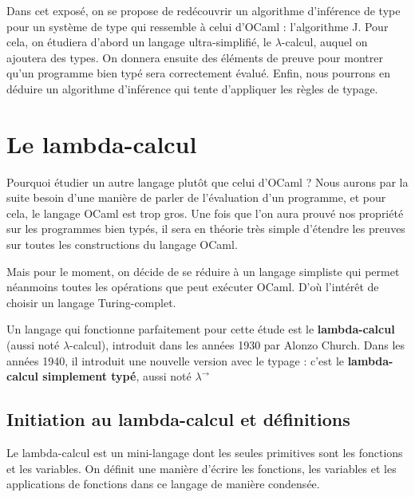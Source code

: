 \documentclass[11pt]{article}
\begin{document}
Dans cet exposé, on se propose de redécouvrir un algorithme d'inférence de type pour un système de type qui ressemble à celui d'OCaml : l'algorithme J. Pour cela, on étudiera d'abord un langage ultra-simplifié, le $\lambda$-calcul, auquel on ajoutera des types. On donnera ensuite des éléments de preuve pour montrer qu'un programme bien typé sera correctement évalué. Enfin, nous pourrons en déduire un algorithme d'inférence qui tente d'appliquer les règles de typage.


\section{Le lambda-calcul}

Pourquoi étudier un autre langage plutôt que celui d'OCaml ? Nous aurons par la suite besoin d'une manière de parler de l'évaluation d'un programme, et pour cela, le langage OCaml est trop gros. Une fois que l'on aura prouvé nos propriété sur les programmes bien typés, il sera en théorie très simple d'étendre les preuves sur toutes les constructions du langage OCaml.

Mais pour le moment, on décide de se réduire à un langage simpliste qui permet néanmoins toutes les opérations que peut exécuter OCaml. D'où l'intérêt de choisir un langage Turing-complet.

Un langage qui fonctionne parfaitement pour cette étude est le \textbf{lambda-calcul} (aussi noté $\lambda$-calcul), introduit dans les années 1930 par Alonzo Church. Dans les années 1940, il introduit une nouvelle version avec le typage : c'est le \textbf{lambda-calcul simplement typé}, aussi noté $\lambda^{\rightarrow}$

\subsection{Initiation au lambda-calcul et définitions}

Le lambda-calcul est un mini-langage dont les seules primitives sont les fonctions et les variables. On définit une manière d'écrire les fonctions, les variables et les applications de fonctions dans ce langage de manière condensée.
\end{document}
